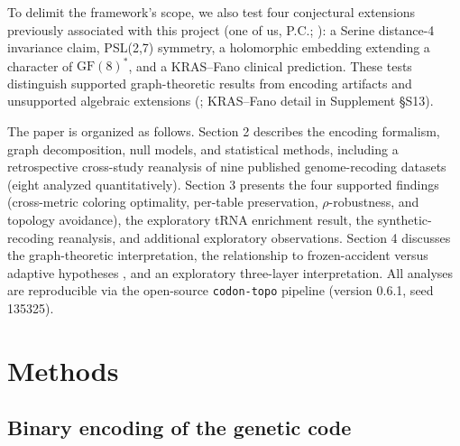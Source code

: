 \documentclass[preprint,11pt,authoryear,a4paper]{elsarticle}
\begin{document}
To delimit the framework's scope, we also test four conjectural
extensions previously associated with this project (one of us, P.C.;
\citep{clayworth2026}): a Serine distance-4 invariance claim, PSL(2,7)
symmetry, a holomorphic embedding extending a character of
\({\text{GF}(8)}^{\ast}\), and a KRAS--Fano clinical prediction. These
tests distinguish supported graph-theoretic results from encoding
artifacts and unsupported algebraic extensions
(; KRAS--Fano detail in Supplement §S13).

The paper is organized as follows. Section 2 describes the encoding
formalism, graph decomposition, null models, and statistical methods,
including a retrospective cross-study reanalysis of nine published
genome-recoding datasets (eight analyzed quantitatively). Section 3
presents the four supported findings (cross-metric coloring optimality,
per-table preservation, \(\rho\)-robustness, and topology avoidance),
the exploratory tRNA enrichment result, the synthetic-recoding
reanalysis, and additional exploratory observations. Section 4 discusses
the graph-theoretic interpretation, the relationship to frozen-accident
versus adaptive hypotheses \citep{koonin2009}, and an exploratory
three-layer interpretation. All analyses are reproducible via the
open-source \texttt{codon-topo} pipeline (version 0.6.1, seed 135325).

\section{Methods}\label{sec:methods}

\subsection{Binary encoding of the genetic code}\label{sec:encoding}
\end{document}
